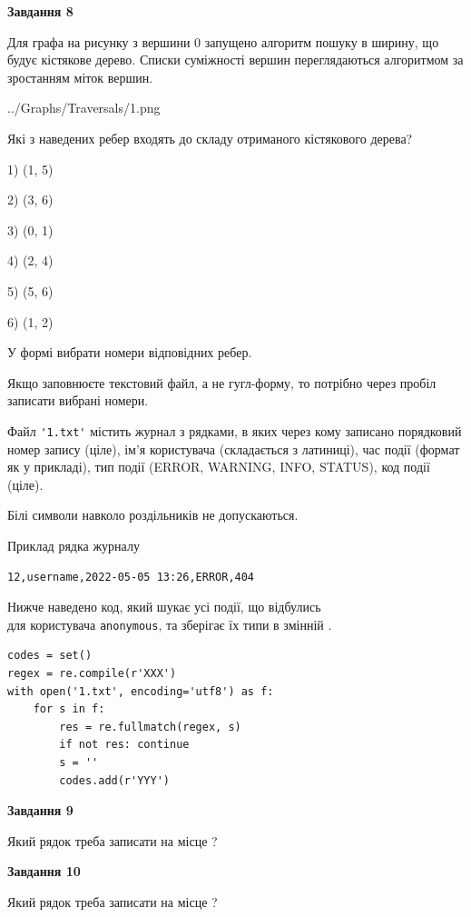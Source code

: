 \documentclass[12pt, ukrainian]{article}
\def\code#1{\Verb!#1!}
\begin{document}
{\begin {large}
{\begin {center}\textbf{Завдання 8}\end {center}}\par
Для графа на рисунку з вершини 0 запущено алгоритм пошуку в ширину, що будує кістякове дерево. Списки суміжності вершин переглядаються алгоритмом за зростанням міток вершин.\par
\begin{center}
	{../Graphs/Traversals/1.png}
\end{center}
\par Які з наведених ребер входять до складу отриманого кістякового дерева?\par
1) (1, 5)\par
2) (3, 6)\par
3) (0, 1)\par
4) (2, 4)\par
5) (5, 6)\par
6) (1, 2)\par
{\vskip 15pt} У формі вибрати номери відповідних ребер.


Якщо заповнюєте текстовий файл, а не гугл-форму, то потрібно через пробіл записа\-ти вибрані номери.\par
\newpage


Файл \code{'1.txt'} містить журнал з рядками, в яких через кому записано поряд\-ко\-вий номер запису (ціле), ім'я користувача (складається з латиниці), час події (фор\-мат як у прикладі), тип події (ERROR, WARNING, INFO, STATUS), код події (ціле).

Білі символи навколо роздільників не допускаються.

Приклад рядка журналу



\begin{verbatim}
12,username,2022-05-05 13:26,ERROR,404
\end{verbatim}


Нижче наведено код, який шукає усі події, що відбулись\\ для користувача \code{anonymous}, та зберігає їх типи в змінній .



\begin{verbatim}
codes = set()
regex = re.compile(r'XXX')
with open('1.txt', encoding='utf8') as f:
    for s in f:
        res = re.fullmatch(regex, s)
        if not res: continue
        s = ''
        codes.add(r'YYY')
\end{verbatim}


{\begin {center}\textbf{Завдання 9}\end {center}}\par
Який рядок треба записати на місце  ?\par
\vspace{5mm}


{\begin {center}\textbf{Завдання 10}\end {center}}\par
Який рядок треба записати на місце  ?\par


\newpage


\end {large}}
\end{document}
